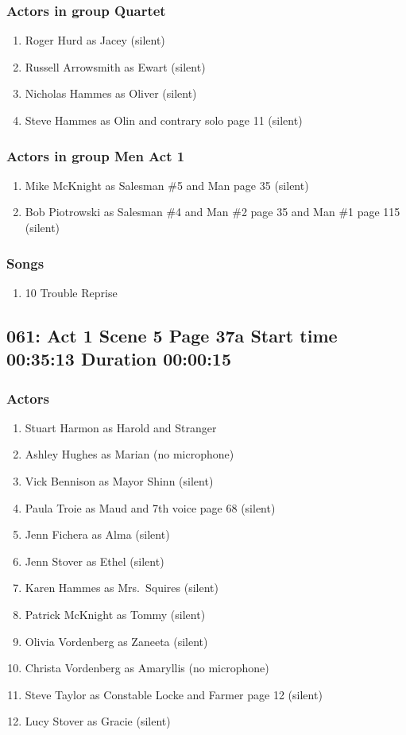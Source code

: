 \subsubsection{Actors in group Quartet}
\begin{enumerate}
\item Roger Hurd as Jacey (silent)
\item Russell Arrowsmith as Ewart (silent)
\item Nicholas Hammes as Oliver (silent)
\item Steve Hammes as Olin and contrary solo page 11 (silent)
\end{enumerate}
\subsubsection{Actors in group Men Act 1}
\begin{enumerate}
\item Mike McKnight as Salesman \#5 and Man page 35 (silent)
\item Bob Piotrowski as Salesman \#4 and Man \#2 page 35 and Man \#1 page 115 (silent)
\end{enumerate}

\subsubsection{Songs}
\begin{enumerate}
\item 10 Trouble Reprise
\end{enumerate}
\subsection{061: Act 1 Scene 5 Page 37a Start time 00:35:13 Duration 00:00:15}

\subsubsection{Actors}
\begin{enumerate}
\item Stuart Harmon as Harold and Stranger
\item Ashley Hughes as Marian (no microphone)
\item Vick Bennison as Mayor Shinn (silent)
\item Paula Troie as Maud and 7th voice page 68 (silent)
\item Jenn Fichera as Alma (silent)
\item Jenn Stover as Ethel (silent)
\item Karen Hammes as Mrs.~Squires (silent)
\item Patrick McKnight as Tommy (silent)
\item Olivia Vordenberg as Zaneeta (silent)
\item Christa Vordenberg as Amaryllis (no microphone)
\item Steve Taylor as Constable Locke and Farmer page 12 (silent)
\item Lucy Stover as Gracie (silent)
\end{enumerate}
